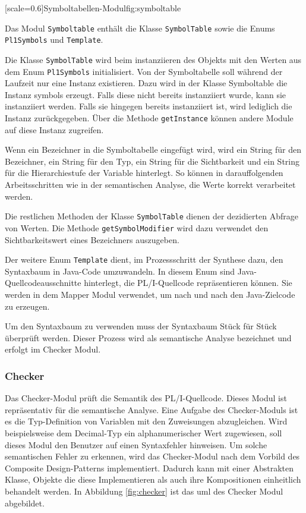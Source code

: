 [scale=0.6]{Symboltabellen-Modul}{fig:symboltable}

Das Modul \verb+Symboltable+ enthält die Klasse \verb+SymbolTable+
sowie die Enums \verb+Pl1Symbols+ und \verb+Template+.

Die Klasse \verb+SymbolTable+ wird beim instanziieren des Objekts mit den Werten aus dem Enum \verb+Pl1Symbols+ initialisiert. Von der Symboltabelle soll während der Laufzeit nur eine Instanz existieren. 
Dazu wird in der Klasse Symboltable die Instanz symbols erzeugt. Falls diese nicht bereits instanziiert wurde, kann sie instanziiert werden. Falls sie hingegen bereits instanziiert ist, wird lediglich die Instanz zurückgegeben.
Über die Methode \verb+getInstance+ können andere Module auf diese Instanz zugreifen.

Wenn ein Bezeichner in die Symboltabelle eingefügt wird, wird ein String für den Bezeichner, ein String für den Typ, ein String für die Sichtbarkeit und ein String für die Hierarchiestufe der Variable hinterlegt. So können in darauffolgenden Arbeitsschritten wie in der semantischen Analyse, die Werte korrekt verarbeitet werden.

Die restlichen Methoden der Klasse \verb+SymbolTable+ dienen der dezidierten Abfrage von Werten. Die Methode \verb+getSymbolModifier+ wird dazu verwendet den Sichtbarkeitswert eines Bezeichners auszugeben.

Der weitere Enum \verb+Template+ dient, im Prozessschritt der Synthese dazu, den Syntaxbaum in Java-Code umzuwandeln.
In diesem Enum sind Java-Quellcodeausschnitte hinterlegt, die PL/I-Quellcode repräsentieren können. Sie werden in dem Mapper Modul verwendet,
um nach und nach den Java-Zielcode zu erzeugen.

Um den Syntaxbaum zu verwenden muss der Syntaxbaum Stück für Stück überprüft werden. Dieser Prozess wird als semantische Analyse bezeichnet und erfolgt im Checker Modul.
 
 \pagebreak
\subsubsection{Checker}
Das Checker-Modul prüft die Semantik des PL/I-Quellcode.
Dieses Modul ist repräsentativ für die semantische Analyse. 
Eine Aufgabe des Checker-Moduls ist es die Typ-Definition von Variablen mit den Zuweisungen abzugleichen.
Wird beispielsweise dem Decimal-Typ ein alphanumerischer Wert zugewiesen, soll dieses Modul den Benutzer auf einen Syntaxfehler hinweisen. Um solche semantischen Fehler zu erkennen, wird das Checker-Modul nach dem Vorbild des Composite Design-Patterns implementiert. Dadurch kann mit einer Abstrakten Klasse, Objekte die diese Implementieren als auch ihre Kompositionen einheitlich behandelt werden.
In Abbildung \ref{fig:checker} ist das \ac{uml} des Checker Modul abgebildet.

